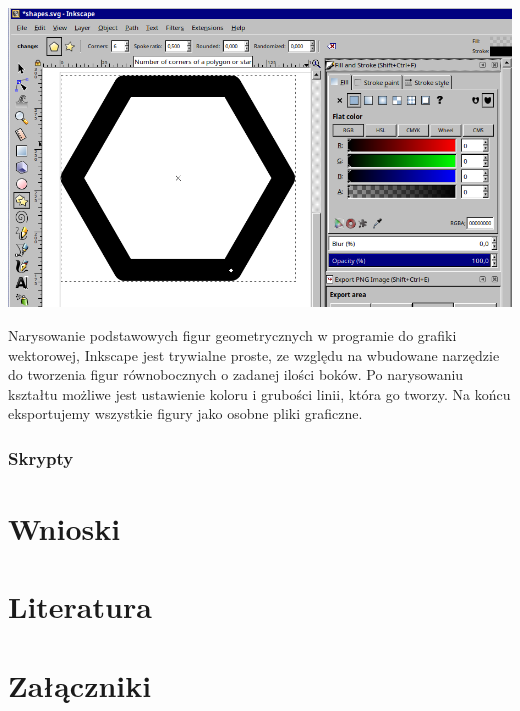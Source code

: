 \documentclass{article} %
\begin{document}
            \begin{center}
            \includegraphics[scale=0.3,keepaspectratio=true]{images/screenshots/work/6-tworzenie-ui_002.png}
            \end{center}

            
            Narysowanie podstawowych figur geometrycznych w programie do grafiki wektorowej, Inkscape jest trywialne proste, ze względu na wbudowane narzędzie do tworzenia figur równobocznych o zadanej ilości boków. Po narysowaniu kształtu możliwe jest ustawienie koloru i grubości linii, która go tworzy. Na końcu eksportujemy wszystkie figury jako osobne pliki graficzne.
            \\
        
        \subsubsection{Skrypty}       


\section{Wnioski}


\newpage
\section{Literatura}

\newpage
\section{Załączniki}
\end{document}
